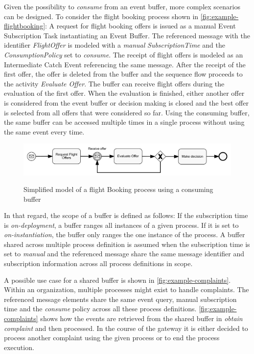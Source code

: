 Given the possibility to \textit{consume} from an event buffer, more complex scenarios can be designed.
To consider the flight booking process shown in \autoref{fig:example-flightbooking}: A request for flight booking offers is issued as a manual Event Subscription Task instantiating an Event Buffer. The referenced message with the identifier \textit{FlightOffer} is modeled with a \textit{manual} \textit{SubscriptionTime} and the \textit{ConsumptionPolicy} set to \textit{consume}.
The receipt of flight offers is modeled as an Intermediate Catch Event referencing the same message. After the receipt of the first offer, the offer is deleted from the buffer and the sequence flow proceeds to the activity \textit{Evaluate Offer}.
The buffer can receive flight offers during the evaluation of the first offer.
When the evaluation is finished, either another offer is considered from the event buffer or decision making is closed and the best offer is selected from all offers that were considered so far.
Using the consuming buffer, the same buffer can be accessed multiple times in a single process without using the same event every time.

\begin{figure}[]
	\myfloatalign
	{\includegraphics[width=1\linewidth]{chapters/concept/bpmnx/FlightBooking.png}}
	\caption{Simplified model of a flight Booking process using a consuming buffer}\label{fig:example-flightbooking}
\end{figure}

In that regard, the scope of a buffer is defined as follows: If the subscription time is \textit{on-deployment}, a buffer ranges all instances of a given process. If it is set to \textit{on-instantiation}, the buffer only ranges the one instance of the process. A buffer shared across multiple process definition is assumed when the subscription time is set to \textit{manual} and the referenced message share the same message identifier and subscription information across all process definitions in scope.

A possible use case for a shared buffer is shown in \autoref{fig:example-complaints}. Within an organization, multiple processes might exist to handle complaints. The referenced message elements share the same event query, manual subscription time and the \textit{consume} policy across all these process definitions. \autoref{fig:example-complaints} shows how the events are retrieved from the shared buffer in \textit{obtain complaint} and then processed. In the course of the gateway it is either decided to process another complaint using the given process or to end the process execution.

